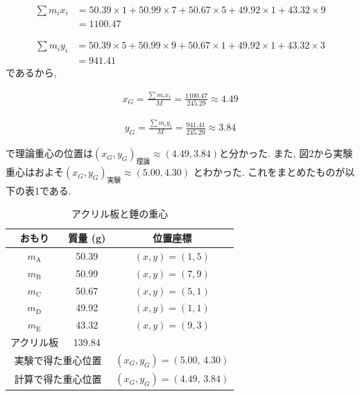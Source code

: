 \documentclass{jlreq}
\begin{document}
\begin{align}
    \sum m_i x_i &= 50.39 \times 1 + 50.99 \times 7 + 50.67 \times 5 + 49.92 \times 1 + 43.32 \times 9\\
                 &= 1100.47
\end{align}

\begin{align}
    \sum m_i y_i &= 50.39 \times 5 + 50.99 \times 9 + 50.67 \times 1 + 49.92 \times 1 + 43.32 \times 3\\
                 &= 941.41
\end{align}
であるから, 

\begin{align}
    x_G = \frac{\sum m_i x_i}{M} = \frac{1100.47}{245.29} \approx 4.49
\end{align}

\begin{align}
    y_G = \frac{\sum m_i y_i}{M} = \frac{941.41}{245.29} \approx 3.84
\end{align}

で理論重心の位置は$(x_G,y_G)_{理論} \approx (4.49,3.84)$と分かった. 
また, 図2から実験重心はおよそ$(x_G,y_G)_{実験} \approx (5.00,4.30)$
とわかった. 
これをまとめたものが以下の表1である. 


\begin{table}[htbp]
  \centering
  \caption{アクリル板と錘の重心}
  \begin{tabular}{|c|c|c|}
    \hline
    おもり & 質量 (g) & 位置座標 \\
    \hline
    $m_{\mathrm{A}}$ & 50.39 & $(x,y) = (1,5)$ \\
    \hline
    $m_{\mathrm{B}}$ & 50.99 & $(x,y) = (7,9)$ \\
    \hline
    $m_{\mathrm{C}}$ & 50.67 & $(x,y) = (5,1)$ \\
    \hline
    $m_{\mathrm{D}}$ & 49.92 & $(x,y) = (1,1)$ \\
    \hline
    $m_{\mathrm{E}}$ & 43.32 & $(x,y) = (9,3)$ \\
    \hline
    アクリル板 & 139.84 &  \\
    \hline
    \multicolumn{2}{|c|}{実験で得た重心位置} &
      $(x_G,y_G) = (5.00,\,4.30)$ \\
    \hline
    \multicolumn{2}{|c|}{計算で得た重心位置} &
      $(x_G,y_G) = (4.49,\,3.84)$ \\
    \hline
  \end{tabular}
  \label{tab:cg_acrylic}
\end{table}
\end{document}
